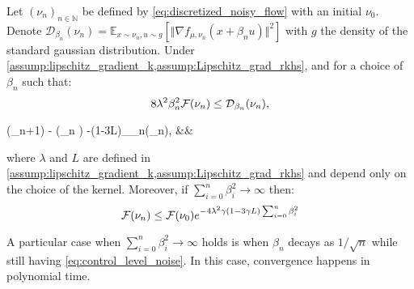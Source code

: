 \begin{proposition}\label{thm:convergence_noisy_gradient}
	Let $(\nu_n)_{n\in \mathbb{N}}$ be defined by \cref{eq:discretized_noisy_flow} with an initial $\nu_0$. Denote $\mathcal{D}_{\beta_n}(\nu_n)=\mathbb{E}_{x\sim \nu_n, u\sim g}[\Vert \nabla f_{\mu,\nu_n}(x+\beta_n u) \Vert^2]$ with $g$ the density of the standard gaussian distribution.	Under \cref{assump:lipschitz_gradient_k,assump:Lipschitz_grad_rkhs}, and for a choice of $\beta_n$ such that:
	\begin{equation}\label{eq:control_level_noise}
	8\lambda^2\beta_n^2 {{\mathcal F}}(\nu_n) \leq \mathcal{D}_{\beta_n}(\nu_n),
	\end{equation}
	\begin{flalign}\label{eq:decreasing_loss_iterations}
\quad\quad	\F(\nu_{n+1}) - \F(\nu_n  ) \leq -(1-3\gamma L)_{\beta_n}(\nu_n), &&
	\end{flalign}
	where $\lambda$ and $L$ are defined in \cref{assump:lipschitz_gradient_k,assump:Lipschitz_grad_rkhs} and depend only on the choice of the kernel. Moreover, if  $\sum_{i=0}^n \beta_i^2 \rightarrow \infty $ then:
	\begin{equation}
	{{\mathcal F}}(\nu_n)\leq {{\mathcal F}}(\nu_0) e^{-4\lambda^2\gamma(1-3\gamma L)\sum_{i=0}^n \beta^2_i}
	\end{equation}
\end{proposition}
A particular case when $\sum_{i=0}^n \beta_i^2 \rightarrow \infty$ holds is when $\beta_n$ decays as $1/\sqrt{n}$ while still having \cref{eq:control_level_noise}. In this case, convergence happens in polynomial time.
